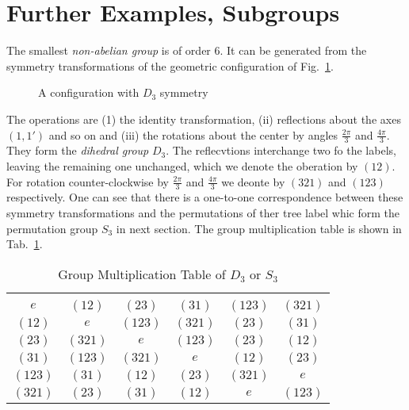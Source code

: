 \section{Further Examples, Subgroups}
The smallest \textit{non-abelian group} is of order $6$.
It can be generated from the symmetry transformations of the geometric configuration of Fig.~\ref{fig:1-2}.
\begin{figure}[b]
  \centering
  \caption{A configuration with $D_3$ symmetry}
  \label{fig:1-2}
\end{figure}
The operations are (1) the identity transformation, (ii) reflections about the axes $\left(1,1'\right)$ and so on and (iii) the rotations about the center by angles $\frac{2\pi}{3}$ and $\frac{4\pi}{3}$.
They form the \textit{dihedral group} $D_{3}$.
The reflecvtions interchange two fo the labels, leaving the remaining one unchanged, which we denote the oberation by $\left( 12\right)$.
For rotation counter-clockwise by $\frac{2\pi}{3}$ and $\frac{4\pi}{3}$ we deonte by $\left(321\right)$ and $\left(123\right)$ respectively.
One can see that there is a one-to-one correspondence between these symmetry transformations and the permutations of ther tree label whic form the permutation group $S_{3}$ in next section.
The group multiplication table is shown in Tab.~\ref{tab:1-4}.
\begin{table}
  \centering
  \begin{tabular}{c c c c c c}
    \hline \\
    $e$ & $\left(12\right)$ & $\left(23\right)$ & $\left(31\right)$ & $\left(123\right)$ & $\left(321\right)$ \\
    $\left(12\right)$ & $e$ & $\left(123\right)$ & $\left(321\right)$ & $\left(23\right)$ & $\left(31\right)$ \\
    $\left(23\right)$ & $\left(321\right)$ & $e$ & $\left(123\right)$ & $\left(23\right)$ & $\left(12\right)$ \\
    $\left(31\right)$ & $\left(123\right)$ & $\left(321\right)$ & $e$ & $\left(12\right)$ & $\left(23\right)$ \\
    $\left(123\right)$ & $\left(31\right)$ & $\left(12\right)$ & $\left(23\right)$ & $\left(321\right)$ & $e$ \\
    $\left(321\right)$ & $\left(23\right)$ & $\left(31\right)$ & $\left(12\right)$ & $e$ & $\left(123\right)$ \\
    \hline
  \end{tabular}
  \caption{Group Multiplication Table of $D_3$ or $S_3$}
  \label{tab:1-4}
\end{table}

